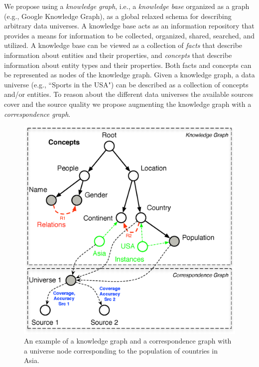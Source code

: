 \documentclass{sig-alternate}
\begin{document}
We propose using a {\em knowledge graph}, i.e., a {\em knowledge base} organized as a graph (e.g., Google Knowledge Graph), as a global relaxed schema for describing arbitrary data universes. A knowledge base acts as an information repository that provides a means for information to be collected, organized, shared, searched, and utilized. A knowledge base can be viewed as a collection of {\em facts} that describe information about entities and their properties, and {\em concepts} that describe information about entity types and their properties. Both facts and concepts can be represented as nodes of the knowledge graph. Given a knowledge graph, a data universe (e.g., ``Sports in the USA") can be described as a collection of concepts and/or entities. To reason about the different data universes the available sources cover and the source quality we propose augmenting the knowledge graph with a {\em correspondence graph}.

\begin{figure}
	\begin{center}
	\includegraphics[clip,scale=0.4]{fig/kgcg}
	\caption{An example of a knowledge graph and a correspondence graph with a universe node corresponding to the population of countries in Asia.}
	\label{fig:kgcg}
	\end{center}
\end{figure}
\end{document}
